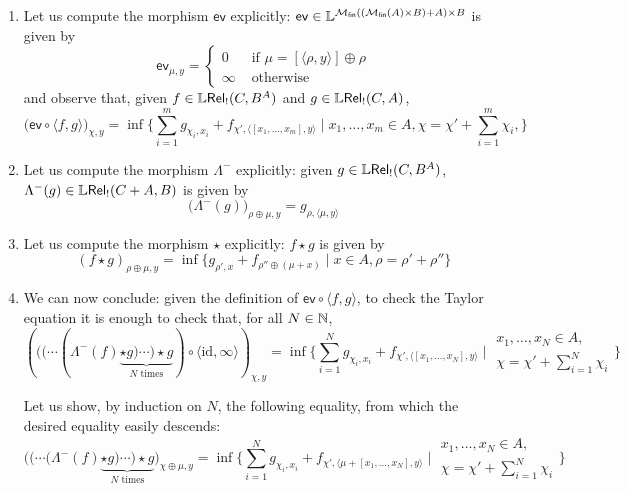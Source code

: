 \begin{enumerate}

\item Let us compute the morphism $\mathsf{ev}$ explicitly: $\mathsf{ev}\in \mathbb{L}^{ \mathcal{M}_{\mathsf{fin}}(  ( \mathcal{M}_{\mathsf{fin}}(A)\times B)       +  A    ) \times B  }$ is given by
$$\mathsf{ev}_{\mu,y}=
 \begin{cases}
 0 & \text{ if } \mu=[ \langle\rho, y\rangle]  \oplus \rho \\
 \infty & \text{ otherwise}
 \end{cases}
 $$
and observe that, given $f\in \mathbb{L} \mathsf{Rel}_!(C, B^{A})$ and $g\in \mathbb{L} \mathsf{Rel}_!(C,A)$, 
$$
\big(\mathsf{ev}\circ \langle f,g\rangle \big)_{\chi, y}= 
\inf\Big \{ 
\sum_{i=1}^{m}g_{\chi_{i},x_{i}}+
f_{\chi', \langle [x_{1},\dots, x_{m}],y\rangle}
\mid 
x_{1},\dots, x_{m}\in A,
\chi= \chi'+\sum_{i=1}^{m}\chi_{i}, 
\Big \}
$$



\item Let us compute the morphism $\Lambda^{-}$ explicitly: given $g\in \mathbb{L} \mathsf{Rel}_!(C, B^{A})$, 
$\Lambda^{-}(g)\in \mathbb{L} \mathsf{Rel}_!(C+A, B)$ is given by 
$$
\big(\Lambda^{-}(g)\big)_{\rho\oplus\mu,y}=g_{\rho, \langle \mu,y\rangle}
$$


\item Let us compute the morphism $\star$ explicitly: $f\star g$ is given by 
$$
(f\star g)_{\rho\oplus\mu,y}=
\inf\Big\{
g_{\rho',x}+
f_{\rho''\oplus(\mu+x)}
\mid
x\in A,
\rho= \rho'+\rho''
\Big\}
$$

\item We can now conclude: given the definition of $\mathsf{ev}\circ \langle f,g\rangle$, to check the Taylor equation it is enough to check that, for all $N\in \mathbb{N}$, 
$$
\left((( \cdots (\Lambda^{-}(f) \underbrace{\star g)\cdots )\star g}_{N\text{ times}})\circ \langle \mathrm{id}, \infty\rangle\right)_{\chi,y}=
\inf\Big \{ 
\sum_{i=1}^{N}g_{\chi_{i},x_{i}}+
f_{\chi', \langle [x_{1},\dots, x_{N}],y\rangle}
\mid 
\begin{matrix}
x_{1},\dots, x_{N}\in A,\\
\chi= \chi'+\sum_{i=1}^{N}\chi_{i}
\end{matrix}
\Big \}
$$

Let us show, by induction on $N$, the following equality, from which the desired equality easily descends:
$$
\big(( \cdots (\Lambda^{-}(f) \underbrace{\star g)\cdots )\star g}_{N\text{ times}}\big)_{\chi\oplus\mu,y}=
\inf\Big \{ 
\sum_{i=1}^{N}g_{\chi_{i},x_{i}}+
f_{\chi', \langle\mu+ [x_{1},\dots, x_{N}],y\rangle}
\mid 
\begin{matrix}
x_{1},\dots, x_{N}\in A,\\
\chi= \chi'+\sum_{i=1}^{N}\chi_{i}
\end{matrix}
\Big \}
$$
\begin{itemize}


\end{itemize}
\end{enumerate}
